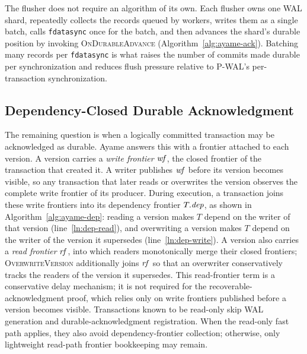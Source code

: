 \begin{algorithm}[t]
\caption{\bfseries Worker-Side Commit Protocol (Ayame)}
\label{alg:ayame-commit}
\begin{algorithmic}[1]
\EndFunction
\end{algorithmic}
\end{algorithm}

The flusher does not require an algorithm of its own.  Each flusher owns
one WAL shard, repeatedly collects the records queued by workers, writes
them as a single batch, calls \texttt{fdatasync} once for the batch, and
then advances the shard's durable position by invoking
\textsc{OnDurableAdvance} (Algorithm~\ref{alg:ayame-ack}).  Batching many
records per \texttt{fdatasync} is what raises the number of commits made
durable per synchronization and reduces flush pressure relative to
P-WAL's per-transaction synchronization.

\subsection{Dependency-Closed Durable Acknowledgment}
\label{sec:depack}

The remaining question is when a logically committed transaction may be
acknowledged as durable.  Ayame answers this with a frontier attached to
each version.  A version carries a \emph{write frontier} $\mathit{wf}$, the
closed frontier of the transaction that created it.  A writer publishes
$\mathit{wf}$ before its version becomes visible, so any transaction that later
reads or overwrites the version observes the complete write frontier of
its producer.  During execution, a transaction joins these write
frontiers into its dependency frontier $T.\mathit{dep}$, as shown in
Algorithm~\ref{alg:ayame-dep}: reading a version makes $T$ depend on the
writer of that version (line~\ref{ln:dep-read}), and overwriting a
version makes $T$ depend on the writer of the version it supersedes
(line~\ref{ln:dep-write}).  A version also carries a \emph{read frontier}
$\mathit{rf}$, into which readers monotonically merge their closed frontiers;
\textsc{OverwriteVersion} additionally joins $\mathit{rf}$ so that an overwriter
conservatively tracks the readers of the version it supersedes.  This
read-frontier term is a conservative delay mechanism; it is not required for
the recoverable-acknowledgment proof, which relies only on write frontiers
published before a version becomes visible.  Transactions known to be
read-only skip WAL generation and durable-acknowledgment registration.
When the read-only fast path applies, they also avoid dependency-frontier
collection; otherwise, only lightweight read-path frontier bookkeeping
may remain.

